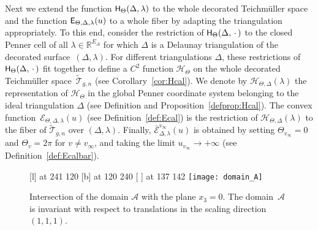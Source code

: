 \documentclass[a4paper, 11pt]{article}
\newcommand{\R}{\mathbb{R}}
\newcommand{\Teich}{\mathcal{T}}
\newcommand{\decTeich}{\widetilde{\Teich}}
\newcommand{\Tm}{Teich\-m{\"u}l\-ler}
\newcommand{\Acal}{\mathcal{A}}
\newcommand{\Hcal}{\mathcal{H}}
\newcommand{\Ecal}{\mathcal{E}}
\newcommand{\Ecalbar}{\bar{\Ecal}}
\newcommand{\Hsf}{\scalebox{0.94}{$\mathsf{H}$}}
\newcommand{\Esf}{\scalebox{0.94}{$\mathsf{E}$}}
\theoremstyle{plain}
\theoremstyle{definition}
\begin{document}
Next we extend the function $\Hsf_{\Theta}(\Delta,\lambda)$ to the
whole decorated \Tm{} space and the function
$\Esf_{\Theta,\Delta,\lambda}(u)$ to a whole fiber by adapting the
triangulation appropriately. To this end, consider the restriction of
$\Hsf_{\Theta}(\Delta,\,\cdot\,)$ to the closed Penner cell of all
$\lambda\in\R^{E_{\Delta}}$ for which $\Delta$ is a Delaunay
triangulation of the decorated surface~$(\Delta,\lambda)$. For
different triangulations $\Delta$, these restrictions of
$\Hsf_{\Theta}(\Delta,\,\cdot\,)$ fit together to define a
$C^{2}$ function $\Hcal_{\Theta}$ on the whole decorated {\Tm}
space~$\decTeich_{g,n}$ (see Corollary~\ref{cor:Hcal}). We denote by
$\Hcal_{\Theta,\Delta}(\lambda)$ the representation of
$\Hcal_{\Theta}$ in the global Penner coordinate system belonging to
the ideal triangulation $\Delta$ (see Definition and
Proposition~\ref{defprop:Hcal}). The convex
function~$\Ecal_{\Theta,\Delta,\lambda}(u)$
(see Definition~\ref{def:Ecal}) is the restriction of
$\Hcal_{\Theta,\Delta}(\lambda)$ to the fiber of $\decTeich_{g,n}$
over $(\Delta,\lambda)$. Finally,
$\Ecalbar^{v_{\infty}}_{\Delta,\lambda}(u)$ is obtained by setting
$\Theta_{v_{\infty}}=0$ and $\Theta_{v}=2\pi$ for $v\not=v_{\infty}$,
and taking the limit $u_{v_{\infty}}\rightarrow+\infty$
(see Definition~\ref{def:Ecalbar}).


\begin{figure}
  \small\hair 2pt
   [l] at 241 120
   [b] at 120 240
  \pinlabel {$\Acal$} [ ] at 137 142
  \endlabellist
  \centering
  \texttt{[image: domain\_A]}
  \caption{Intersection of the domain $\Acal$ with the plane
    $x_{3}=0$. The domain~$\Acal$ is invariant with respect to translations in
    the scaling direction $(1,1,1)$.}
  \label{fig:Acal}
\end{figure}
\end{document}
